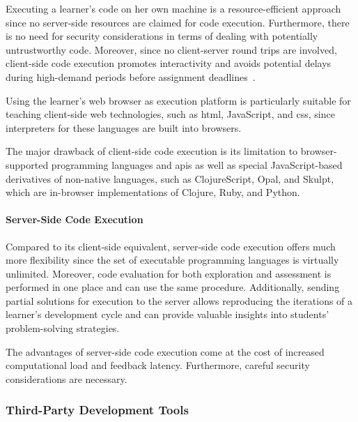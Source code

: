 Executing a learner's code on her own machine is a resource-efficient approach since no server-side resources are claimed for code execution. Furthermore, there is no need for security considerations in terms of dealing with potentially untrustworthy code. Moreover, since no client-server round trips are involved, client-side code execution promotes interactivity and avoids potential delays during high-demand periods before assignment deadlines~\cite{lahtinen2005study}.

Using the learner's web browser as execution platform is particularly suitable for teaching client-side web technologies, such as \gls{html}, JavaScript, and \gls{css}, since interpreters for these languages are built into browsers.

The major drawback of client-side code execution is its limitation to browser-supported programming languages and \glspl{api} as well as special JavaScript-based derivatives of non-native languages, such as ClojureScript, Opal, and Skulpt, which are in-browser implementations of Clojure, Ruby, and Python.

\paragraph{Server-Side Code Execution}

Compared to its client-side equivalent, server-side code execution offers much more flexibility since the set of executable programming languages is virtually unlimited. Moreover, code evaluation for both exploration and assessment is performed in one place and can use the same procedure. Additionally, sending partial solutions for execution to the server allows reproducing the iterations of a learner's development cycle and can provide valuable insights into students' problem-solving strategies.

The advantages of server-side code execution come at the cost of increased computational load and feedback latency. Furthermore, careful security considerations are necessary.

\subsubsection{Third-Party Development Tools}

